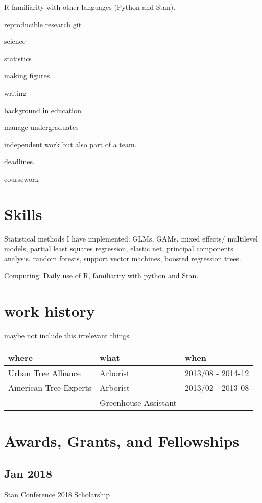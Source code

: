 \documentclass{article}
\begin{document}
R
familiarity with other languages (Python and Stan).

reproducible research git

science

statistics

making figures

writing

background in education

manage undergraduates

independent work but also part of a team.

deadlines.

coursework

\section*{Skills}
\label{sec:org1813e6e}
Statistical methods I have implemented: GLMs, GAMs, mixed effects/
multilevel models, partial least squares regression, elastic net, principal
components analysis, random forests, support vector machines, boosted
regression trees.

Computing: Daily use of R, familiarity with python and Stan.


\section*{work history}
\label{sec:org901622a}

maybe not include this irrelevant things

\begin{center}
\begin{tabular}{lll}
where & what & when\\
\hline
Urban Tree Alliance & Arborist & 2013/08 - 2014-12\\
American Tree Experts & Arborist & 2013/02 - 2013-08\\
 & Greenhouse Assistant & \\
\end{tabular}
\end{center}


\section*{Awards, Grants, and Fellowships}
\label{sec:org7928da9}
\subsection*{Jan 2018}
\label{sec:org88e84a5}
\href{http://mc-stan.org/events/}{Stan Conference 2018} Scholarship
\end{document}
